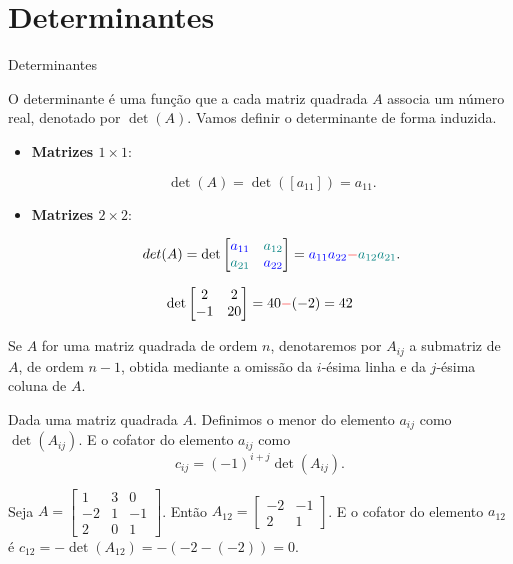\section{Determinantes}

\begin{frame}[label=determinantes]{Determinantes}

O {\color{blue}determinante} é uma função que a cada matriz quadrada $A$ associa um número real, denotado por {\color{blue} $\det(A)$}. Vamos definir o determinante de forma induzida.
\medskip

\begin{itemize}
\item {\color{blue} \textbf{Matrizes $1\times 1$}:}

\[\det(A)=\det([a_{11}])=a_{11}.\]

\item {\color{blue} \textbf{Matrizes $2\times 2$}:}

\[det(A)=\det \begin{bmatrix}
{\color{blue}a_{11}} &{\color{teal} a_{12}}\\ {\color{teal}a_{21}} & {\color{blue}a_{22}}
\end{bmatrix}={\color{blue}a_{11}a_{22}}{\color{red}-}{\color{teal}a_{12}a_{21}}.  \] 
\end{itemize}

\begin{exe}
\[\det\begin{bmatrix}
2 & 2\\ -1 & 20 
\end{bmatrix}=40{\color{red}-}(-2)=42\]
\end{exe}

\end{frame}

\begin{frame}[label=determinantes]
Se $A$ for uma matriz quadrada de ordem $n$, denotaremos por $A_{ij}$ a submatriz de $A$, de ordem $n-1$, obtida mediante a omissão da $i$-ésima linha e da $j$-ésima coluna de $A$.
\begin{defin}
Dada uma matriz quadrada $A$. Definimos o {\color{blue} menor do elemento $a_{ij}$} como $\det(A_{ij})$. E o {\color{blue} cofator do elemento $a_{ij}$} como 
\[c_{ij}=(-1)^{i+j}\det(A_{ij}).\]
\end{defin}
\begin{exe}
Seja $A=\begin{bmatrix}
1 & 3 & 0 \\ -2 & 1 & -1 \\ 2 & 0 & 1
\end{bmatrix}$. Então $A_{12}=\begin{bmatrix}
 -2  & -1 \\ 2 &  1 
\end{bmatrix}$. E o cofator do elemento $a_{12}$ é $c_{12}=-\det(A_{12})=-(-2-(-2))=0$.
\end{exe}

\end{frame}

